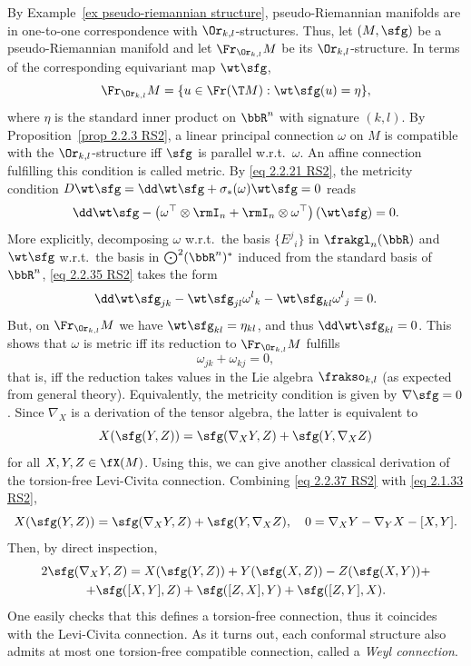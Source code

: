 \begin{example}
    By Example~\ref{ex pseudo-riemannian structure}, pseudo-Riemannian manifolds are in one-to-one correspondence with $\Or_{k,l}$-structures. Thus, let $(M,\sfg)$ be a pseudo-Riemannian manifold and let $\Fr_{\Or_{k,l}} M$ be its $\Or_{k,l}$-structure. In terms of the corresponding equivariant map $\wt\sfg$, 
    \[\Fr_{\Or_{k,l}}M=\{u \in\Fr(\T M):\wt\sfg(u)=\eta\},\]
    where $\eta$ is the standard inner product on $\bbR^n$ with signature $(k,l)$. By Proposition~\ref{prop 2.2.3 RS2}, a linear principal connection $\omega$ on $M$ is compatible with the $\Or_{k,l}$-structure iff $\sfg$ is parallel w.r.t.\ $\omega$. An affine connection fulfilling this condition is called metric. By \eqref{eq 2.2.21 RS2}, the metricity condition $D\wt\sfg=\dd\wt\sfg+\sigma_\ast(\omega)\wt\sfg=0$ reads 
    \[\dd\wt\sfg-\left(\omega^\top \otimes \rmI_n+\rmI_n\otimes \omega^\top \right)(\wt\sfg)=0.\label{eq 2.2.35 RS2}\]
    More explicitly, decomposing $\omega$ w.r.t.\ the basis $\{E^j{}_i\}$ in $\frakgl_n(\bbR)$ and $\wt\sfg$ w.r.t.\ the basis in $\bigodot\nolimits^2(\bbR^n)^\ast$ induced from the standard basis of $\bbR^n$, \eqref{eq 2.2.35 RS2} takes the form 
    \[\dd \wt\sfg_{jk}-\wt\sfg_{jl}\omega^l{}_k-\wt\sfg_{kl}\omega^l{}_j=0.\]
    But, on $\Fr_{\Or_{k,l}} M$ we have $\wt\sfg_{kl}=\eta_{kl}$, and thus $\dd\wt\sfg_{kl}=0$. This shows that $\omega$ is metric iff its reduction to $\Fr_{\Or_{k,l}}M$ fulfills 
    \[\omega_{jk}+\omega_{kj}=0,\]
    that is, iff the reduction takes values in the Lie algebra $\frakso_{k,l}$ (as expected from general theory). Equivalently, the metricity condition is given by $\nabla\sfg=0$. Since $\nabla_X$ is a derivation of the tensor algebra, the latter is equivalent to 
    \[X(\sfg(Y,Z))=\sfg(\nabla_X Y,Z)+\sfg(Y,\nabla_X Z)\label{eq 2.2.37 RS2}\]
    for all $X,Y,Z\in\fX(M)$. Using this, we can give another classical derivation of the torsion-free Levi-Civita connection. Combining \eqref{eq 2.2.37 RS2} with \eqref{eq 2.1.33 RS2}, 
    \[X(\sfg(Y,Z))=\sfg(\nabla_X Y,Z)+\sfg(Y,\nabla_X Z),\quad 0=\nabla_X Y-\nabla_Y X-[X,Y].\]
    Then, by direct inspection,
    \begin{multline}
        2\sfg(\nabla_X Y,Z)=X(\sfg(Y,Z))+Y(\sfg(X,Z))-Z(\sfg(X,Y))+\\
        +\sfg([X,Y],Z)+\sfg([Z,X],Y)+\sfg([Z,Y],X).\label{eq 2.2.40 RS2}
    \end{multline}
    One easily checks that this defines a torsion-free connection, thus it coincides with the Levi-Civita connection.  As it turns out, each conformal structure also admits at most one torsion-free compatible connection, called a \emph{Weyl connection}.
\end{example}


